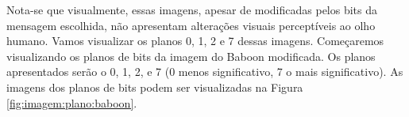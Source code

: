 \documentclass{article}
\begin{document}
\noindent
Nota-se que visualmente, essas imagens, apesar de modificadas pelos bits da mensagem escolhida, não apresentam alterações visuais perceptíveis ao olho humano. Vamos visualizar os planos 0, 1, 2 e 7 dessas imagens. Começaremos visualizando os planos de bits da imagem do Baboon modificada. Os planos apresentados serão o 0, 1, 2, e 7 (0 menos significativo, 7 o mais significativo). As imagens dos planos de bits podem ser visualizadas na Figura \ref{fig:imagem:plano:baboon}.

\begin{figure}[htp]%
	\centering
	\qquad
	\qquad
	

\end{figure}
\end{document}
